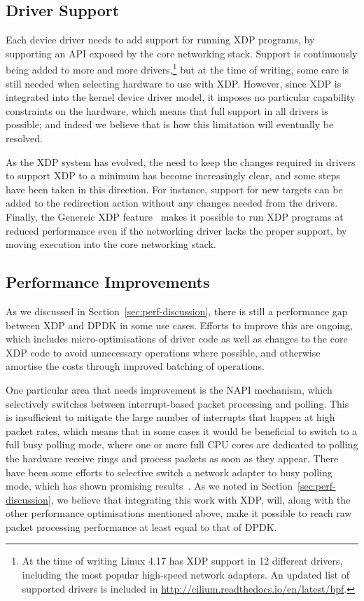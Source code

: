 \documentclass[10pt,sigconf]{acmart}
\begin{document}
\subsection{Driver Support}
\label{sec:driver-support}
Each device driver needs to add support for running XDP programs, by supporting
an API exposed by the core networking stack. Support is continuously being added
to more and more drivers,\footnote{At the time of writing Linux 4.17 has XDP
  support in 12 different drivers, including the most popular high-speed network
  adapters. An updated list of supported drivers is included in
  \url{http://cilium.readthedocs.io/en/latest/bpf}.} but at the time of writing,
some care is still needed when selecting hardware to use with XDP. However,
since XDP is integrated into the kernel device driver model, it imposes no
particular capability constraints on the hardware, which means that full support
in all drivers is possible; and indeed we believe that is how this limitation
will eventually be resolved.

As the XDP system has evolved, the need to keep the changes required in drivers
to support XDP to a minimum has become increasingly clear, and some steps have
been taken in this direction. For instance, support for new targets can be added
to the redirection action without any changes needed from the drivers. Finally,
the Genereic XDP feature~\cite{generic-xdp} makes it possible to run XDP
programs at reduced performance even if the networking driver lacks the proper
support, by moving execution into the core networking stack.

\subsection{Performance Improvements}
\label{sec:improvements-napi}
As we discussed in Section~\ref{sec:perf-discussion}, there is still a
performance gap between XDP and DPDK in some use cases. Efforts to improve this
are ongoing, which includes micro-optimisations of driver code as well as
changes to the core XDP code to avoid unnecessary operations where possible, and
otherwise amortise the costs through improved batching of operations.

One particular area that needs improvement is the NAPI mechanism, which
selectively switches between interrupt-based packet processing and polling. This
is insufficient to mitigate the large number of interrupts that happen at high
packet rates, which means that in some cases it would be beneficial to switch to
a full busy polling mode, where one or more full CPU cores are dedicated to
polling the hardware receive rings and process packets as soon as they appear.
There have been some efforts to selective switch a network adapter to busy
polling mode, which has shown promising results~\cite{dumazet17:_busyp}. As we
noted in Section~\ref{sec:perf-discussion}, we believe that integrating this
work with XDP, will, along with the other performance optimisations mentioned
above, make it possible to reach raw packet processing performance at least
equal to that of DPDK.
\end{document}

